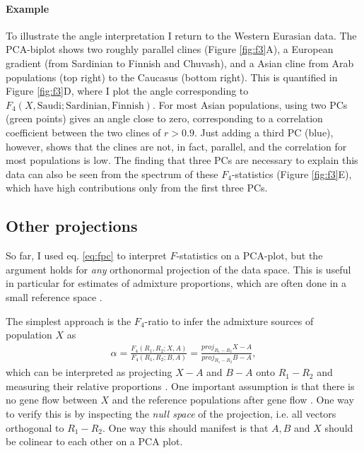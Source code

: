 \documentclass[12pt,fullpage, a4paper]{article}
\newcommand{\vectorproj}[2][]{\textit{proj}_{#1}#2}
\begin{document}
\paragraph{Example}
To illustrate the angle interpretation I return to the Western Eurasian data. The PCA-biplot shows two roughly parallel clines (Figure \ref{fig:f3}A), a European gradient (from Sardinian to Finnish and Chuvash), and a Asian cline from Arab populations (top right) to the Caucasus  (bottom right). This is quantified in Figure \ref{fig:f3}D, where I plot the angle corresponding to $F_4(X, \text{Saudi}; \text{Sardinian}, \text{Finnish})$. For most Asian populations, using two PCs (green points) gives an angle close to zero, corresponding to a correlation coefficient between the two clines of $r>0.9$. Just adding a third PC (blue), however, shows that the clines are not, in fact, parallel, and the correlation for most populations is low. The finding that three PCs are necessary to explain this data can also be seen from the spectrum of these $F_4$-statistics (Figure \ref{fig:f3}E), which have high contributions only from the first three PCs.

\subsection{Other projections}
So far, I used eq. \ref{eq:fpc} to interpret $F$-statistics on a PCA-plot, but the argument holds for \emph{any} orthonormal projection of the data space. This is useful in particular for estimates of admixture proportions, which are often done in a small reference space \citep{patterson2012, petr2019, harney2021, oteo-garcia2021}. 

The simplest approach is the $F_4$-ratio to infer the admixture sources of population $X$ as 
\begin{eqnarray}
\alpha = \frac{F_4(R_1, R_2; X, A)}{F_4(R_1, R_2; B, A)} = \frac{\vectorproj[R_1 - R_2]{X - A}}{\vectorproj[R_1 - R_2]{B - A}} \label{eq:f4ratio},
\end{eqnarray}
which can be interpreted as projecting $X-A$ and $B-A$ onto $R_1 - R_2$ and measuring their relative proportions \citep{oteo-garcia2021}. One important assumption is that there is no gene flow between $X$ and the reference populations after gene flow \citep{petr2019}. One way to verify this is by inspecting the \emph{null space} of the projection, i.e. all vectors orthogonal to $R_1 - R_2$. One way this should manifest is that $A, B$ and $X$ should be colinear to each other on a PCA plot. 
\end{document}
